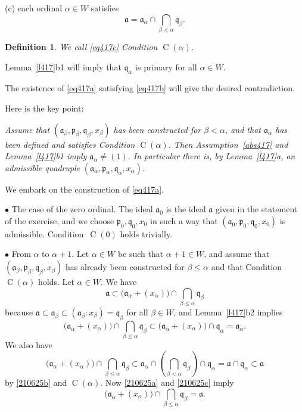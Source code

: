 \documentclass[12pt,letterpaper]{article}%
\newcommand{\oo}{\operatorname}\newcommand{\ooo}{\operatorname*}
\newcommand{\mf}{\mathfrak}
\newcommand{\aaa}{\mf a}
\newcommand{\ppp}{\mf p}
\newcommand{\qqq}{\mf q}
\newcommand{\bu}{\bullet}
\newcommand{\nn}{\noindent}
\newtheorem{df}[thm]{Definition}
\begin{document}
(c) each ordinal $\alpha\in W$ satisfies 
\begin{equation}\label{eq417c}
\aaa=\aaa_\alpha\cap\bigcap_{\beta<\alpha}\qqq_\beta.
\end{equation}
\begin{df}\label{calpha}
We call \eqref{eq417c} Condition $\oo C(\alpha)$. 
\end{df}

Lemma~\ref{l417}b1 will imply that $\qqq_\alpha$ is primary for all $\alpha\in W$. 

The existence of \eqref{eq417a} satisfying \eqref{eq417b} will give the desired contradiction.

Here is the key point:

\nn\emph{Assume that $(\aaa_\beta,\ppp_\beta,\qqq_\beta,x_\beta)$ has been constructed for $\beta<\alpha$, and that $\aaa_\alpha$ has been defined and satisfies Condition $\oo C(\alpha)$. Then Assumption~\eqref{abs417} and Lemma~\ref{l417}b1 imply $\aaa_\alpha\ne(1)$. In particular there is, by Lemma~\ref{l417}a, an admissible quadruple} $(\aaa_\alpha,\ppp_\alpha,\qqq_\alpha,x_\alpha)$.

We embark on the construction of \eqref{eq417a}.

\nn$\bu$ The case of the zero ordinal. The ideal $\aaa_0$ is the ideal $\aaa$ given in the statement of the exercise, and we choose $\ppp_0,\qqq_0,x_0$ in such a way that $(\aaa_0,\ppp_0,\qqq_0,x_0)$ is admissible. Condition~$\oo C(0)$ holds trivially.

\nn$\bu$ From $\alpha$ to $\alpha+1$. Let $\alpha\in W$ be such that $\alpha+1\in W$, and assume that $(\aaa_\beta,\ppp_\beta,\qqq_\beta,x_\beta)$ has already been constructed for $\beta\le\alpha$ and that Condition $\oo C(\alpha)$ holds. Let $\alpha\in W$. We have 
\begin{equation}\label{210625a}
\aaa\subset\big(\aaa_\alpha+(x_\alpha)\big)\cap\bigcap_{\beta\le\alpha}\qqq_\beta
\end{equation} 
because $\aaa\subset\aaa_\beta\subset(\aaa_\beta:x_\beta)=\qqq_\beta$ for all $\beta\in W$, and Lemma~\ref{l417}b2 implies 
\begin{equation}\label{210625b}
\big(\aaa_\alpha+(x_\alpha)\big)\cap\bigcap_{\beta\le\alpha}\qqq_\beta\subset \big(\aaa_\alpha+(x_\alpha)\big)\cap\qqq_\alpha=\aaa_\alpha.
\end{equation} 
We also have %
\begin{equation}\label{210625c}
\big(\aaa_\alpha+(x_\alpha)\big)\cap\bigcap_{\beta\le\alpha}\qqq_\beta\subset 
\aaa_\alpha\cap\left(\bigcap_{\beta<\alpha}\qqq_\beta\right)\cap\qqq_\alpha=\aaa\cap\qqq_\alpha\subset
\aaa
\end{equation} 
by \eqref{210625b} and $\oo C(\alpha)$. Now \eqref{210625a} and \eqref{210625c} imply 
\begin{equation}\label{210625d}
\big(\aaa_\alpha+(x_\alpha)\big)\cap\bigcap_{\beta\le\alpha}\qqq_\beta=\aaa.
\end{equation}
\end{document}
